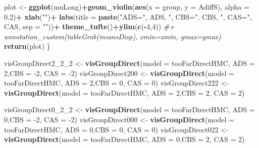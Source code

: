 \documentclass[10pt,dvipsnames,enabledeprecatedfontcommands]{scrartcl}
\newenvironment{Shaded}{\begin{snugshade}}{\end{snugshade}}
\newcommand{\KeywordTok}[1]{\textcolor[rgb]{0.13,0.29,0.53}{\textbf{#1}}}
\newcommand{\DataTypeTok}[1]{\textcolor[rgb]{0.13,0.29,0.53}{#1}}
\newcommand{\DecValTok}[1]{\textcolor[rgb]{0.00,0.00,0.81}{#1}}
\newcommand{\FloatTok}[1]{\textcolor[rgb]{0.00,0.00,0.81}{#1}}
\newcommand{\StringTok}[1]{\textcolor[rgb]{0.31,0.60,0.02}{#1}}
\newcommand{\CommentTok}[1]{\textcolor[rgb]{0.56,0.35,0.01}{\textit{#1}}}
\newcommand{\OperatorTok}[1]{\textcolor[rgb]{0.81,0.36,0.00}{\textbf{#1}}}
\newcommand{\NormalTok}[1]{#1}
\begin{document}
\begin{Shaded}
\begin{Highlighting}[]
\NormalTok{  plot <-}\StringTok{ }\KeywordTok{ggplot}\NormalTok{(muLong)}\OperatorTok{+}\KeywordTok{geom_violin}\NormalTok{(}\KeywordTok{aes}\NormalTok{(}\DataTypeTok{x =}\NormalTok{ group, }\DataTypeTok{y =}\NormalTok{ AdiffS), }\DataTypeTok{alpha =} \FloatTok{0.2}\NormalTok{)}\OperatorTok{+}
\StringTok{    }\KeywordTok{xlab}\NormalTok{(}\StringTok{""}\NormalTok{)}\OperatorTok{+}
\StringTok{    }\KeywordTok{labs}\NormalTok{(}\DataTypeTok{title =} \KeywordTok{paste}\NormalTok{(}\StringTok{"ADS="}\NormalTok{, ADS, }\StringTok{", CBS="}\NormalTok{,  CBS, }\StringTok{", CAS="}\NormalTok{, CAS,  }\DataTypeTok{sep =} \StringTok{""}\NormalTok{))}\OperatorTok{+}
\StringTok{    }\KeywordTok{theme_tufte}\NormalTok{()}\OperatorTok{+}\KeywordTok{ylim}\NormalTok{(}\KeywordTok{c}\NormalTok{(}\OperatorTok{-}\DecValTok{4}\NormalTok{,}\DecValTok{4}\NormalTok{))}
  \CommentTok{#+   annotation_custom(tableGrob(meansDisp), xmin=xmin,  ymax=ymax)}
  \KeywordTok{return}\NormalTok{(plot)}
\NormalTok{\}}



\NormalTok{visGroupDirect2_}\DecValTok{2}\NormalTok{_}\DecValTok{2}\NormalTok{ <-}\StringTok{  }\KeywordTok{visGroupDirect}\NormalTok{(}\DataTypeTok{model =}\NormalTok{ tooFarDirectHMC, }\DataTypeTok{ADS =} \DecValTok{2}\NormalTok{,}\DataTypeTok{CBS =} \DecValTok{-2}\NormalTok{, }\DataTypeTok{CAS =} \DecValTok{-2}\NormalTok{)}
\NormalTok{visGroupDirect200 <-}\StringTok{  }\KeywordTok{visGroupDirect}\NormalTok{(}\DataTypeTok{model =}\NormalTok{ tooFarDirectHMC, }\DataTypeTok{ADS =} \DecValTok{2}\NormalTok{,}\DataTypeTok{CBS =} \DecValTok{0}\NormalTok{, }\DataTypeTok{CAS =} \DecValTok{0}\NormalTok{)}
\NormalTok{visGroupDirect222 <-}\StringTok{ }\KeywordTok{visGroupDirect}\NormalTok{(}\DataTypeTok{model =}\NormalTok{ tooFarDirectHMC, }\DataTypeTok{ADS =} \DecValTok{2}\NormalTok{,}\DataTypeTok{CBS =} \DecValTok{2}\NormalTok{, }\DataTypeTok{CAS =} \DecValTok{2}\NormalTok{)}

\NormalTok{visGroupDirect0_}\DecValTok{2}\NormalTok{_}\DecValTok{2}\NormalTok{ <-}\StringTok{  }\KeywordTok{visGroupDirect}\NormalTok{(}\DataTypeTok{model =}\NormalTok{ tooFarDirectHMC, }\DataTypeTok{ADS =} \DecValTok{0}\NormalTok{,}\DataTypeTok{CBS =} \DecValTok{-2}\NormalTok{, }\DataTypeTok{CAS =} \DecValTok{-2}\NormalTok{)}
\NormalTok{visGroupDirect000 <-}\StringTok{  }\KeywordTok{visGroupDirect}\NormalTok{(}\DataTypeTok{model =}\NormalTok{ tooFarDirectHMC, }\DataTypeTok{ADS =} \DecValTok{0}\NormalTok{,}\DataTypeTok{CBS =} \DecValTok{0}\NormalTok{, }\DataTypeTok{CAS =} \DecValTok{0}\NormalTok{)}
\NormalTok{visGroupDirect022 <-}\StringTok{ }\KeywordTok{visGroupDirect}\NormalTok{(}\DataTypeTok{model =}\NormalTok{ tooFarDirectHMC, }\DataTypeTok{ADS =} \DecValTok{0}\NormalTok{,}\DataTypeTok{CBS =} \DecValTok{2}\NormalTok{, }\DataTypeTok{CAS =} \DecValTok{2}\NormalTok{)}



\end{Highlighting}
\end{Shaded}
\end{document}
